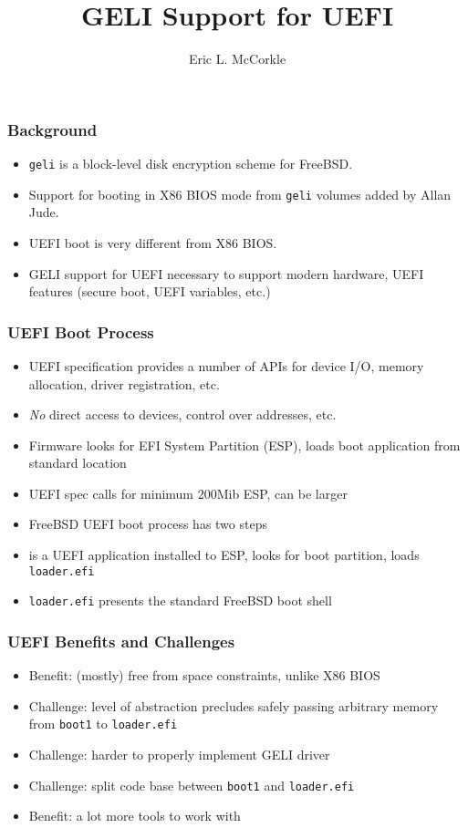 \documentclass{beamer}
\title{GELI Support for UEFI}
\author{Eric L. McCorkle}
\begin{document}
\begin{frame}
  \titlepage{}
\end{frame}

\begin{frame}
  \frametitle{Background}
  \begin{itemize}
  \item \texttt{geli} is a block-level disk encryption scheme for FreeBSD.
  \item Support for booting in X86 BIOS mode from \texttt{geli}
    volumes added by Allan Jude.
  \item UEFI boot is very different from X86 BIOS.
  \item GELI support for UEFI necessary to support modern hardware,
    UEFI features (secure boot, UEFI variables, etc.)
  \end{itemize}
\end{frame}

\begin{frame}
  \frametitle{UEFI Boot Process}
  \begin{itemize}
  \item UEFI specification provides a number of APIs for device I/O,
    memory allocation, driver registration, etc.
  \item \emph{No} direct access to devices, control over addresses, etc.
  \item Firmware looks for EFI System Partition (ESP), loads boot
    application from standard location
  \item UEFI spec calls for minimum 200Mib ESP, can be larger
  \item FreeBSD UEFI boot process has two steps
  \item {} is a UEFI application installed to ESP, looks
    for boot partition, loads \texttt{loader.efi}
  \item \texttt{loader.efi} presents the standard FreeBSD boot shell
  \end{itemize}
\end{frame}

\begin{frame}
  \frametitle{UEFI Benefits and Challenges}
  \begin{itemize}
  \item Benefit: (mostly) free from space constraints, unlike X86 BIOS
  \item Challenge: level of abstraction precludes safely passing
    arbitrary memory from \texttt{boot1} to \texttt{loader.efi}
  \item Challenge: harder to properly implement GELI driver
  \item Challenge: split code base between \texttt{boot1} and
    \texttt{loader.efi}
  \item Benefit: a lot more tools to work with
  \end{itemize}
\end{frame}
\end{document}
